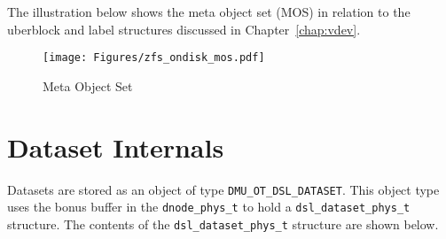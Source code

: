 The illustration below shows the meta object set (MOS)
in relation to the uberblock and label structures discussed in Chapter~\ref{chap:vdev}.

\begin{figure}[ht]
  \centering
  \texttt{[image: Figures/zfs\_ondisk\_mos.pdf]}
  \caption{Meta Object Set}
  \label{fig:mos}
\end{figure}

\section{Dataset Internals}\label{sec:ds_internals}

Datasets are stored as an object of type \lstinline{DMU_OT_DSL_DATASET}.
This object type uses the bonus buffer in the \lstinline{dnode_phys_t}
to hold a \lstinline{dsl_dataset_phys_t} structure.
The contents of the \lstinline{dsl_dataset_phys_t} structure are shown below.

